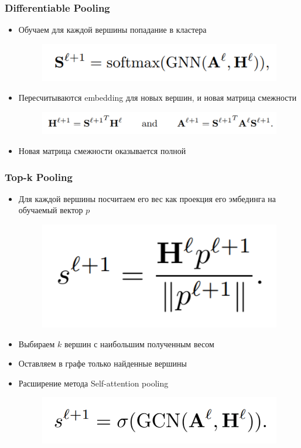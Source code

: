 \documentclass{beamer}
\begin{document}
\begin{frame}
\frametitle{Differentiable Pooling}
\begin{itemize}
	\item Обучаем для каждой вершины попадание в кластера
\begin{figure}
	\includegraphics[width=0.5\columnwidth]{softmax.png}
\end{figure}
	\item Пересчитываются embedding для новых вершин, и новая матрица смежности
	\begin{figure}
		\includegraphics[width=0.8\columnwidth]{differentaible_pooling.png}
	\end{figure}
	\item Новая матрица смежности оказывается полной
\end{itemize}
\end{frame}

\begin{frame}
\frametitle{Top-k Pooling}
\begin{itemize}
	\item Для каждой вершины посчитаем его вес как проекция его эмбединга на обучаемый вектор $p$
	\begin{figure}
		\includegraphics[width=0.3\columnwidth]{top-k_pooing.png}
	\end{figure}
	\item Выбираем $k$ вершин с наибольшим полученным весом
	\item Оставляем в графе только найденные вершины
	\item Расширение метода Self-attention pooling
	\begin{figure}
		\includegraphics[width=0.5\columnwidth]{self-attention_pooing.png}
	\end{figure}
\end{itemize}
\end{frame}
\end{document}
